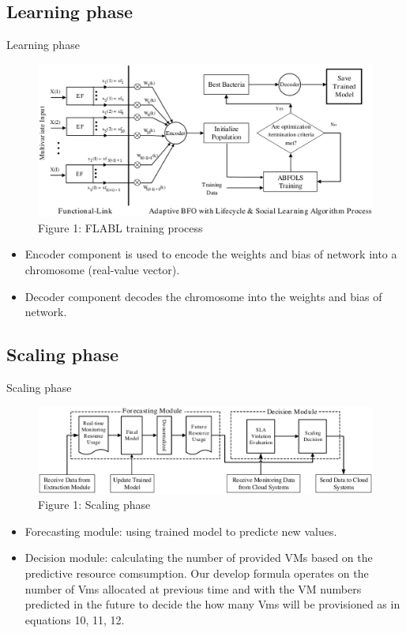 \documentclass{beamer}
\newcommand{\notesize}{\fontsize{8}{10}\selectfont}
\begin{document}
\subsection{Learning phase}
\begin{frame}{Learning phase}

\begin{figure}
		\centering
		\includegraphics[width=0.8 \textwidth]{true/FLBFONN_training.eps} %
		\caption*{\notesize Figure 1: FLABL training process}
		\label{fig:preprocessing}			
\end{figure}
	\begin{itemize}
		\item{\notesize Encoder component is used to encode the weights and bias of network into a chromosome (real-value vector). }
		\item{ \notesize Decoder component decodes the chromosome into the weights and bias of network. }
	\end{itemize}
	
\end{frame}


\subsection{Scaling phase}
\begin{frame}{Scaling phase}
\begin{figure}
		\centering
		\includegraphics[width=0.8 \textwidth]{true/Forecasting_Module.eps} %
		\caption*{\notesize Figure 1: Scaling phase}
		\label{fig:scaling_phase}			
\end{figure}

	\begin{itemize}
		\item{\notesize Forecasting module: using trained model to predicte new values. }
		\item{ \notesize Decision module: calculating the number of provided VMs based on the predictive resource comsumption. Our develop formula operates on the number of Vms allocated at previous time and with the VM numbers predicted in the future to decide the how many Vms will be provisioned as in equations 10, 11, 12.}
	\end{itemize}
\end{frame}
\end{document}
